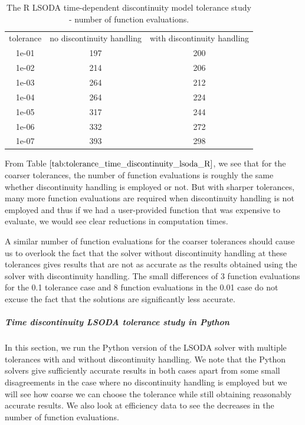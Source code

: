 \begin{table}[H]
\caption {The R LSODA time-dependent discontinuity model tolerance study - number of function evaluations.} \label{tab:tolerance_time_discontinuity_lsoda_R} 
\begin{center}
\begin{tabular}{ c c c }
tolerance & no discontinuity handling & with discontinuity handling \\ 
1e-01 & 197 & 200 \\
1e-02 & 214 & 206 \\
1e-03 & 264 & 212 \\
1e-04 & 264 & 224 \\
1e-05 & 317 & 244 \\
1e-06 & 332 & 272 \\
1e-07 & 393 & 298 \\
\end{tabular}
\end{center}
\end{table}

From Table $\ref{tab:tolerance_time_discontinuity_lsoda_R}$, we see that for the coarser tolerances, the number of function evaluations is roughly the same whether discontinuity handling is employed or not. But with sharper tolerances, many more function evaluations are required when discontinuity handling is not employed and thus if we had a user-provided function that was expensive to evaluate, we would see clear reductions in computation times.

A similar number of function evaluations for the coarser tolerances should cause us to overlook the fact that the solver without discontinuity handling at these tolerances gives results that are not as accurate as the results obtained using the solver with discontinuity handling. The small differences of 3 function evaluations for the 0.1 tolerance case and 8 function evaluations in the 0.01 case do not excuse the fact that the solutions are significantly less accurate.

\subparagraph{Time discontinuity LSODA tolerance study in Python}
In this section, we run the Python version of the LSODA solver with multiple tolerances with and without discontinuity handling. We note that the Python solvers give sufficiently accurate results in both cases apart from some small disagreements in the case where no discontinuity handling is employed but we will see how coarse we can choose the tolerance while still obtaining reasonably accurate results. We also look at efficiency data to see the decreases in the number of function evaluations.

